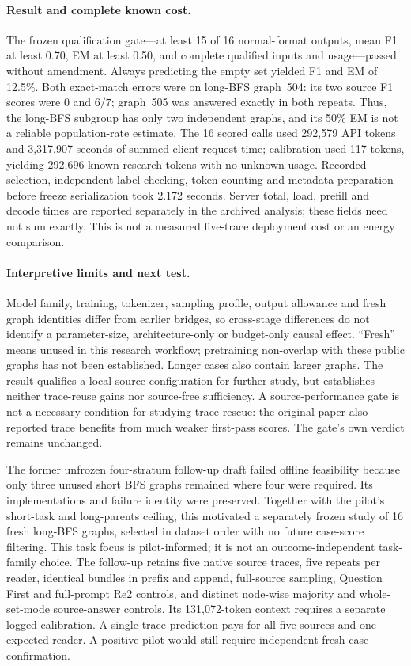 \documentclass[10pt]{article}
\begin{document}
\paragraph{Result and complete known cost.} The frozen qualification gate---at least 15 of 16 normal-format outputs, mean F1 at least 0.70, EM at least 0.50, and complete qualified inputs and usage---passed without amendment. Always predicting the empty set yielded F1 and EM of 12.5\%. Both exact-match errors were on long-BFS graph~504: its two source F1 scores were 0 and $6/7$; graph~505 was answered exactly in both repeats. Thus, the long-BFS subgroup has only two independent graphs, and its 50\% EM is not a reliable population-rate estimate. The 16 scored calls used 292,579 API tokens and 3,317.907 seconds of summed client request time; calibration used 117 tokens, yielding 292,696 known research tokens with no unknown usage. Recorded selection, independent label checking, token counting and metadata preparation before freeze serialization took 2.172 seconds. Server total, load, prefill and decode times are reported separately in the archived analysis; these fields need not sum exactly. This is not a measured five-trace deployment cost or an energy comparison.

\paragraph{Interpretive limits and next test.} Model family, training, tokenizer, sampling profile, output allowance and fresh graph identities differ from earlier bridges, so cross-stage differences do not identify a parameter-size, architecture-only or budget-only causal effect. ``Fresh'' means unused in this research workflow; pretraining non-overlap with these public graphs has not been established. Longer cases also contain larger graphs. The result qualifies a local source configuration for further study, but establishes neither trace-reuse gains nor source-free sufficiency. A source-performance gate is not a necessary condition for studying trace rescue: the original paper also reported trace benefits from much weaker first-pass scores. The gate's own verdict remains unchanged.

The former unfrozen four-stratum follow-up draft failed offline feasibility because only three unused short BFS graphs remained where four were required. Its implementations and failure identity were preserved. Together with the pilot's short-task and long-parents ceiling, this motivated a separately frozen study of 16 fresh long-BFS graphs, selected in dataset order with no future case-score filtering. This task focus is pilot-informed; it is not an outcome-independent task-family choice. The follow-up retains five native source traces, five repeats per reader, identical bundles in prefix and append, full-source sampling, Question First and full-prompt Re2 controls, and distinct node-wise majority and whole-set-mode source-answer controls. Its 131,072-token context requires a separate logged calibration. A single trace prediction pays for all five sources and one expected reader. A positive pilot would still require independent fresh-case confirmation.
\end{document}
